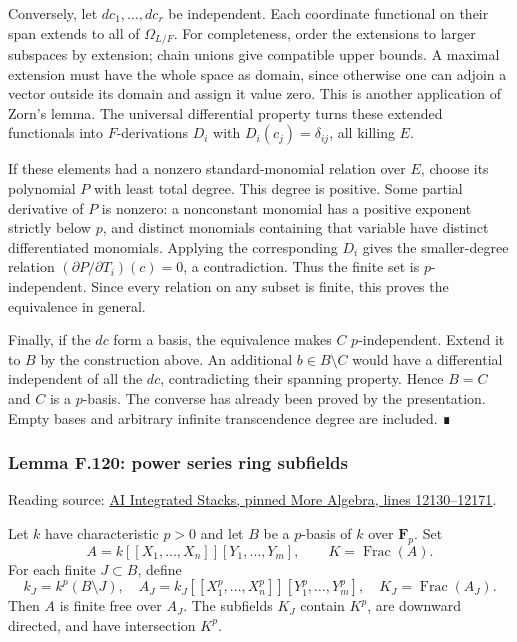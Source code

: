 \documentclass[11pt,a4paper,openany]{report}
\begin{document}
Conversely, let \(dc_1,\ldots,dc_r\) be independent. Each coordinate functional on their span extends to all of \(\Omega_{L/F}\). For completeness, order the extensions to larger subspaces by extension; chain unions give compatible upper bounds. A maximal extension must have the whole space as domain, since otherwise one can adjoin a vector outside its domain and assign it value zero. This is another application of Zorn's lemma. The universal differential property turns these extended functionals into \(F\)-derivations \(D_i\) with \(D_i(c_j)=\delta_{ij}\), all killing \(E\).

If these elements had a nonzero standard-monomial relation over \(E\), choose its polynomial \(P\) with least total degree. This degree is positive. Some partial derivative of \(P\) is nonzero: a nonconstant monomial has a positive exponent strictly below \(p\), and distinct monomials containing that variable have distinct differentiated monomials. Applying the corresponding \(D_i\) gives the smaller-degree relation \((\partial P/\partial T_i)(c)=0\), a contradiction. Thus the finite set is \(p\)-independent. Since every relation on any subset is finite, this proves the equivalence in general.

Finally, if the \(dc\) form a basis, the equivalence makes \(C\) \(p\)-independent. Extend it to \(B\) by the construction above. An additional \(b\in B\setminus C\) would have a differential independent of all the \(dc\), contradicting their spanning property. Hence \(B=C\) and \(C\) is a \(p\)-basis. The converse has already been proved by the presentation. Empty bases and arbitrary infinite transcendence degree are included. ∎

\label{AG-RG-S05-more-algebra-lemma-power-series-ring-subfields}

\subsubsection{Lemma F.120: power series ring subfields}\label{AG-RG-S05-lemma-f.120-power-series-ring-subfields}

Reading source: \href{https://github.com/KokunoYumeto/unofficial-stacks-project-ai-drafts/blob/565b10e987aba5969b21145a0833f42d69f96790/more-algebra.tex\#L12130-L12171}{AI Integrated Stacks, pinned More Algebra, lines 12130--12171}.

Let \(k\) have characteristic \(p>0\) and let \(B\) be a \(p\)-basis of \(k\) over \(\mathbf F_p\). Set \[A=k[[X_1,\ldots,X_n]][Y_1,\ldots,Y_m],\qquad K=\operatorname{Frac}(A).\] For each finite \(J\subset B\), define \[
k_J=k^p(B\setminus J),\quad
A_J=k_J[[X_1^p,\ldots,X_n^p]][Y_1^p,\ldots,Y_m^p],
\quad K_J=\operatorname{Frac}(A_J).
\] Then \(A\) is finite free over \(A_J\). The subfields \(K_J\) contain \(K^p\), are downward directed, and have intersection \(K^p\).
\end{document}
